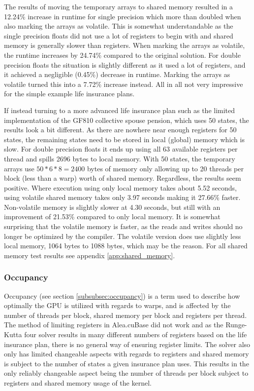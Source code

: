The results of moving the temporary arrays to shared memory resulted in a 12.24\% increase in runtime for single precision which more than doubled when also marking the arrays as volatile.
This is somewhat understandable as the single precision floats did not use a lot of registers to begin with and shared memory is generally slower than registers.
When marking the arrays as volatile, the runtime increases by 24.74\% compared to the original solution.
For double precision floats the situation is slightly different as it used a lot of registers, and it achieved a negligible (0.45\%) decrease in runtime.
Marking the arrays as volatile turned this into a 7.72\% increase instead.
All in all not very impressive for the simple example life insurance plans.

If instead turning to a more advanced life insurance plan such as the limited implementation of the GF810 collective spouse pension, which uses 50 states, the results look a bit different.
As there are nowhere near enough registers for 50 states, the remaining states need to be stored in local (global) memory which is slow.
For double precision floats it ends up using all 63 available registers per thread and spills 2696 bytes to local memory.
With 50 states, the temporary arrays use $50*6*8=2400$ bytes of memory only allowing up to 20 threads per block (less than a warp) worth of shared memory. 
Regardless, the results seem positive.
Where execution using only local memory takes about 5.52 seconds, using volatile shared memory takes only 3.97 seconds making it 27.66\% faster.
Non-volatile memory is slightly slower at 4.30 seconds, but still with an improvement of 21.53\% compared to only local memory.
It is somewhat surprising that the volatile memory is faster, as the reads and writes should no longer be optimized by the compiler.
The volatile version does use slightly less local memory, 1064 bytes to 1088 bytes, which may be the reason.
For all shared memory test results see appendix \ref{app:shared_memory}.

\subsubsection{Occupancy}\label{subsubsec:test:occupancy}
Occupancy (see section \ref{subsubsec:occupancy}) is a term used to describe how optimally the GPU is utilized with regards to warps, and is affected by the number of threads per block, shared memory per block and registers per thread.
The method of limiting registers in Alea.cuBase did not work and as the Runge-Kutta four solver results in many different numbers of registers based on the life insurance plan, there is no general way of ensuring register limits.
The solver also only has limited changeable aspects with regards to registers and shared memory is subject to the number of states a given insurance plan uses.
This results in the only reliably changeable aspect being the number of threads per block subject to registers and shared memory usage of the kernel.

